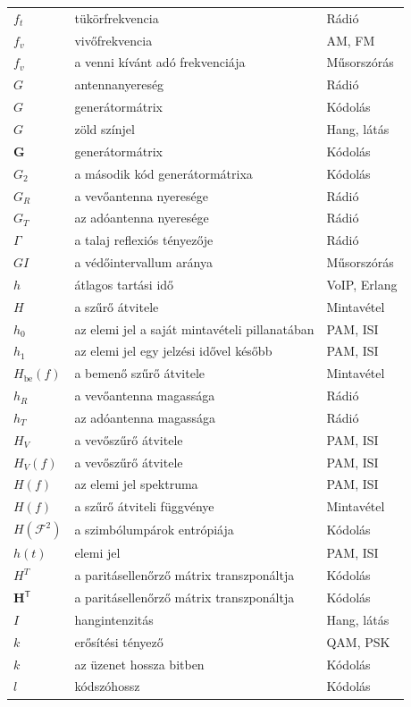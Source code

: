 {\begin{longtable}{@{}>{\raggedright\arraybackslash}p{2.4cm}>{\raggedright\arraybackslash}p{8.2cm}>{\raggedright\arraybackslash}p{3.8cm}@{}}
$f_t$ & tükörfrekvencia & Rádió\\
$f_v$ & vivőfrekvencia & AM, FM\\
$f_v$ & a venni kívánt adó frekvenciája & Műsorszórás\\
$G$ & antennanyereség & Rádió\\
$G$ & generátormátrix & Kódolás\\
$G$ & zöld színjel & Hang, látás\\
$\mathbf G$ & generátormátrix & Kódolás\\
$G_2$ & a második kód generátormátrixa & Kódolás\\
$G_R$ & a vevőantenna nyeresége & Rádió\\
$G_T$ & az adóantenna nyeresége & Rádió\\
$\Gamma$ & a talaj reflexiós tényezője & Rádió\\
$GI$ & a védőintervallum aránya & Műsorszórás\\
$h$ & átlagos tartási idő & VoIP, Erlang\\
$H$ & a szűrő átvitele & Mintavétel\\
$h_0$ & az elemi jel a saját mintavételi pillanatában & PAM, ISI\\
$h_1$ & az elemi jel egy jelzési idővel később & PAM, ISI\\
$H_\text{be}(f)$ & a bemenő szűrő átvitele & Mintavétel\\
$h_R$ & a vevőantenna magassága & Rádió\\
$h_T$ & az adóantenna magassága & Rádió\\
$H_V$ & a vevőszűrő átvitele & PAM, ISI\\
$H_V(f)$ & a vevőszűrő átvitele & PAM, ISI\\
$H(f)$ & az elemi jel spektruma & PAM, ISI\\
$H(f)$ & a szűrő átviteli függvénye & Mintavétel\\
$H(\mathcal F^2)$ & a szimbólumpárok entrópiája & Kódolás\\
$h(t)$ & elemi jel & PAM, ISI\\
$H^T$ & a paritásellenőrző mátrix transzponáltja & Kódolás\\
$\mathbf H^{\mathsf T}$ & a paritásellenőrző mátrix transzponáltja & Kódolás\\
$I$ & hangintenzitás & Hang, látás\\
$k$ & erősítési tényező & QAM, PSK\\
$k$ & az üzenet hossza bitben & Kódolás\\
$l$ & kódszóhossz & Kódolás\\

\end{longtable}}
